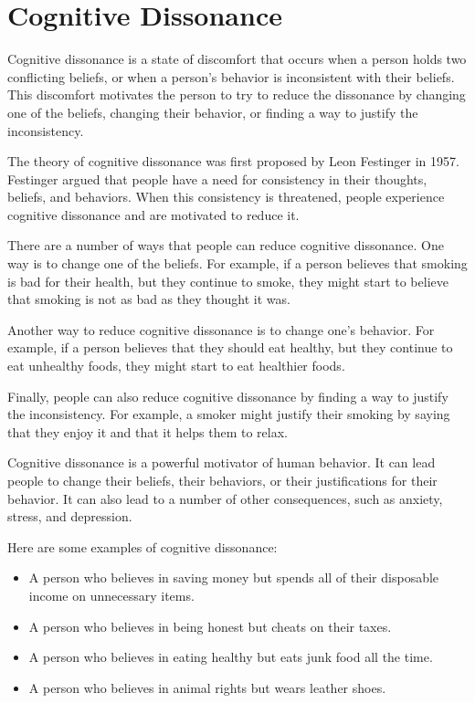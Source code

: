 \documentclass[
  b5paper]{book}
\begin{document}
\hypertarget{cognitive-dissonance}{%
\section{Cognitive Dissonance}\label{cognitive-dissonance}}

Cognitive dissonance is a state of discomfort that occurs when a person holds two conflicting beliefs, or when a person's behavior is inconsistent with their beliefs. This discomfort motivates the person to try to reduce the dissonance by changing one of the beliefs, changing their behavior, or finding a way to justify the inconsistency.

The theory of cognitive dissonance was first proposed by Leon Festinger in 1957. Festinger argued that people have a need for consistency in their thoughts, beliefs, and behaviors. When this consistency is threatened, people experience cognitive dissonance and are motivated to reduce it.

There are a number of ways that people can reduce cognitive dissonance. One way is to change one of the beliefs. For example, if a person believes that smoking is bad for their health, but they continue to smoke, they might start to believe that smoking is not as bad as they thought it was.

Another way to reduce cognitive dissonance is to change one's behavior. For example, if a person believes that they should eat healthy, but they continue to eat unhealthy foods, they might start to eat healthier foods.

Finally, people can also reduce cognitive dissonance by finding a way to justify the inconsistency. For example, a smoker might justify their smoking by saying that they enjoy it and that it helps them to relax.

Cognitive dissonance is a powerful motivator of human behavior. It can lead people to change their beliefs, their behaviors, or their justifications for their behavior. It can also lead to a number of other consequences, such as anxiety, stress, and depression.

Here are some examples of cognitive dissonance:

\begin{itemize}
\item
  A person who believes in saving money but spends all of their disposable income on unnecessary items.
\item
  A person who believes in being honest but cheats on their taxes.
\item
  A person who believes in eating healthy but eats junk food all the time.
\item
  A person who believes in animal rights but wears leather shoes.
\end{itemize}
\end{document}
